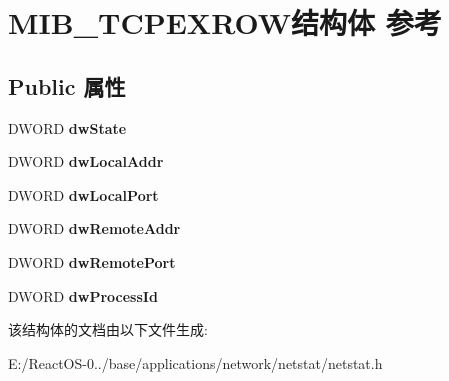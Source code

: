 \hypertarget{struct_m_i_b___t_c_p_e_x_r_o_w}{}\section{M\+I\+B\+\_\+\+T\+C\+P\+E\+X\+R\+O\+W结构体 参考}
\label{struct_m_i_b___t_c_p_e_x_r_o_w}
\subsection*{Public 属性}
\begin{DoxyCompactItemize}
\item 
\mbox{\label{struct_m_i_b___t_c_p_e_x_r_o_w_a3223b3e0c0165c8b9f3d0ca06a729b94}} 
D\+W\+O\+RD {\bfseries dw\+State}
\item 
\mbox{\label{struct_m_i_b___t_c_p_e_x_r_o_w_a4fdf8f834f675adc08999aff7230d488}} 
D\+W\+O\+RD {\bfseries dw\+Local\+Addr}
\item 
\mbox{\label{struct_m_i_b___t_c_p_e_x_r_o_w_a4620df355d8042e6c219ab8fa1a58649}} 
D\+W\+O\+RD {\bfseries dw\+Local\+Port}
\item 
\mbox{\label{struct_m_i_b___t_c_p_e_x_r_o_w_a15f7470f9c2969cfc146b5f3a921260b}} 
D\+W\+O\+RD {\bfseries dw\+Remote\+Addr}
\item 
\mbox{\label{struct_m_i_b___t_c_p_e_x_r_o_w_a3c517fbaad7ae538230de485b7e6e601}} 
D\+W\+O\+RD {\bfseries dw\+Remote\+Port}
\item 
\mbox{\label{struct_m_i_b___t_c_p_e_x_r_o_w_aafb0beed46db2c6aa06edcc1515e51ef}} 
D\+W\+O\+RD {\bfseries dw\+Process\+Id}
\end{DoxyCompactItemize}


该结构体的文档由以下文件生成\+:\begin{DoxyCompactItemize}
\item 
E\+:/\+React\+O\+S-\/0../base/applications/network/netstat/netstat.\+h\end{DoxyCompactItemize}

